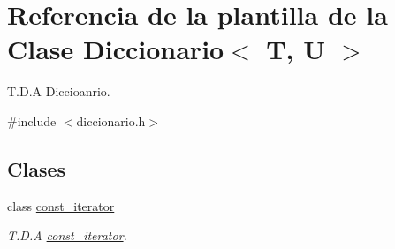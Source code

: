 \hypertarget{classDiccionario}{}\section{Referencia de la plantilla de la Clase Diccionario$<$ T, U $>$}
\label{classDiccionario}


T.\+D.\+A Diccioanrio.  




{\ttfamily \#include $<$diccionario.\+h$>$}

\subsection*{Clases}
\begin{DoxyCompactItemize}
\item 
class \hyperlink{classDiccionario_1_1const__iterator}{const\+\_\+iterator}
\begin{DoxyCompactList}\small\item\em T.\+D.\+A \hyperlink{classDiccionario_1_1const__iterator}{const\+\_\+iterator}. \end{DoxyCompactList}\end{DoxyCompactItemize}
